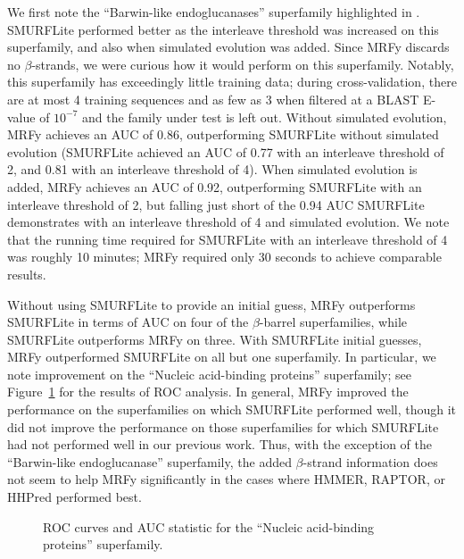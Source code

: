 \documentclass{acm_proc_article-sp}
\begin{document}
We first note the ``Barwin-like endoglucanases'' superfamily highlighted in
\citet{Daniels:2012dg}.
SMURFLite performed better as the interleave threshold was increased on this
superfamily, and also when simulated evolution was added.
Since MRFy discards no $\beta$-strands, we were curious how it would perform
on this superfamily.
Notably, this superfamily has exceedingly little training data; during 
cross-validation, there are at most 4 training sequences and as few as 3
when filtered at a BLAST E-value of $10^{-7}$ and the family under test is left
out.
Without simulated evolution, MRFy achieves an AUC of 0.86, outperforming 
SMURFLite
without simulated evolution (SMURFLite achieved an AUC of 0.77 with an 
interleave threshold of 2, and 0.81 with an interleave threshold of 4).
When simulated evolution is added, MRFy achieves an AUC of 0.92, outperforming
SMURFLite with an interleave threshold of 2, but falling just short of the 0.94
AUC SMURFLite demonstrates with an interleave threshold of 4 and simulated 
evolution.
We note that the running time required for SMURFLite with an interleave
threshold of 4 was roughly 10 minutes; MRFy required only 30 seconds to achieve
comparable results.

Without using SMURFLite to provide an initial guess, MRFy outperforms SMURFLite 
in terms of AUC on four of the $\beta$-barrel 
superfamilies, while SMURFLite outperforms MRFy on three.
With SMURFLite initial guesses, MRFy outperformed SMURFLite on all but one
superfamily.
In particular, we note improvement on the ``Nucleic acid-binding proteins''
superfamily; see Figure~\ref{roc-curves} for the results of ROC analysis.
In general, MRFy improved the performance on the superfamilies on which
SMURFLite performed well, though it did not improve the performance on those
superfamilies for which 
SMURFLite had not performed well in our previous work.
Thus, with the exception of the ``Barwin-like endoglucanase'' superfamily, the
added $\beta$-strand information does not seem to help MRFy significantly in 
the cases where HMMER, RAPTOR, or HHPred performed best.


\begin{figure}[htb!]
\begin{center}
   \caption{ROC curves and AUC statistic for the 
   ``Nucleic acid-binding proteins'' superfamily.
   }
   \label{roc-curves}
 \end{center}
\end{figure}
\end{document}
